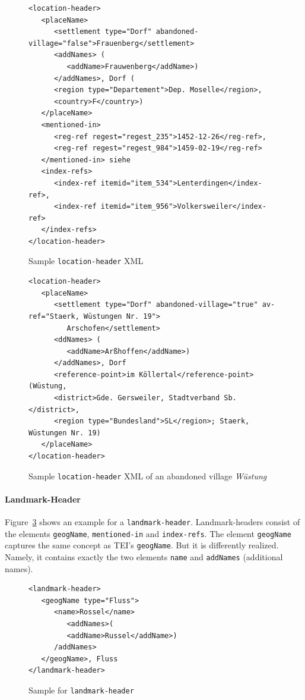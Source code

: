\begin{figure}[H]
\centering
\begin{verbatim}
<location-header>
   <placeName>
      <settlement type="Dorf" abandoned-village="false">Frauenberg</settlement>
      <addNames> (
         <addName>Frauwenberg</addName>)
      </addNames>, Dorf (
      <region type="Departement">Dep. Moselle</region>,
      <country>F</country>)
   </placeName>
   <mentioned-in>
      <reg-ref regest="regest_235">1452-12-26</reg-ref>,
      <reg-ref regest="regest_984">1459-02-19</reg-ref>
   </mentioned-in> siehe
   <index-refs>
      <index-ref itemid="item_534">Lenterdingen</index-ref>,
      <index-ref itemid="item_956">Volkersweiler</index-ref>
   </index-refs>
</location-header>
\end{verbatim}
\caption{Sample \texttt{location-header} XML}
\label{fig:location-header-xml}
\end{figure}

\begin{figure}[H]
\centering
\begin{verbatim}
<location-header>
   <placeName>
      <settlement type="Dorf" abandoned-village="true" av-ref="Staerk, Wüstungen Nr. 19">
         Arschofen</settlement>
      <ddNames> (
         <addName>Arßhoffen</addName>)
      </addNames>, Dorf
      <reference-point>im Köllertal</reference-point> (Wüstung,
      <district>Gde. Gersweiler, Stadtverband Sb.</district>,
      <region type="Bundesland">SL</region>; Staerk, Wüstungen Nr. 19)
   </placeName>
</location-header>
\end{verbatim}
\caption{Sample \texttt{location-header} XML of an abandoned village
  \textit{Wüstung}}
\label{fig:location-wuest-xml}
\end{figure}

\paragraph{Landmark-Header}
Figure~\ref{fig:landmark-header-xml} shows an example for a
\texttt{landmark-header}. Landmark-headers consist of the elements
\texttt{geogName}, \texttt{mentioned-in} and \texttt{index-refs}. The
element \texttt{geogName} captures the same concept as TEI's
\texttt{geogName}. But it is differently realized. Namely, it contains
exactly the two elements \texttt{name} and \texttt{addNames}
(additional names).

\begin{figure}[H]
\centering
\begin{verbatim}
<landmark-header>
   <geogName type="Fluss">
      <name>Rossel</name>
         <addNames>(
         <addName>Russel</addName>)
      /addNames>
   </geogName>, Fluss
</landmark-header>
\end{verbatim}
\caption{Sample for \texttt{landmark-header}}
\label{fig:landmark-header-xml}
\end{figure}

